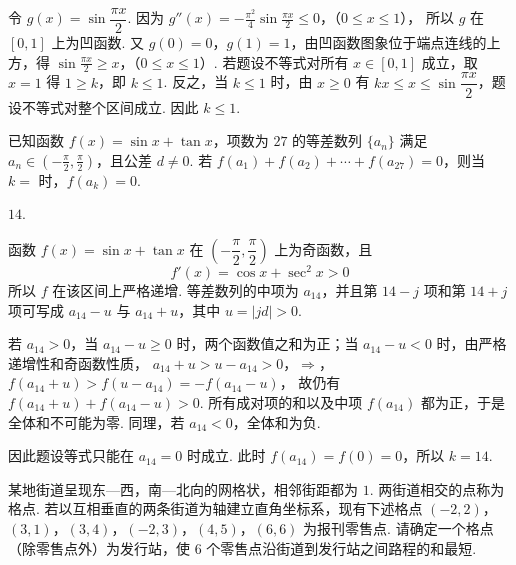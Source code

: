 \begin{solution}
令 \(g(x)=\sin\dfrac{\pi x}{2}\). 因为
\(g''(x)=-\frac{\pi^2}{4}\sin\frac{\pi x}{2}\leqslant0\)，（\(0\leqslant x\leqslant1\)），
所以 \(g\) 在 \([0,1]\) 上为凹函数. 又 \(g(0)=0\)，\(g(1)=1\)，由凹函数图象位于端点连线的上方，得
\(\sin\frac{\pi x}{2}\geqslant x\)，（\(0\leqslant x\leqslant1\)）.
若题设不等式对所有 \(x\in[0,1]\) 成立，取 \(x=1\) 得 \(1\geqslant k\)，即 \(k\leqslant1\). 反之，当 \(k\leqslant1\) 时，由 \(x\geqslant0\) 有 \(kx\leqslant x\leqslant\sin\dfrac{\pi x}{2}\)，题设不等式对整个区间成立. 因此 \(k\leqslant1\).
\end{solution}

\begin{problem}
已知函数 \(f(x) = \sin x + \tan x\)，项数为 \(27\) 的等差数列 \(\{a_n\}\) 满足 \(a_n \in \left( -\frac{\pi}{2}, \frac{\pi}{2} \right)\)，且公差 \(d \neq 0\). 若 \(f(a_1) + f(a_2) + \cdots + f(a_{27}) = 0\)，则当 \(k =\)\fillinblank{} 时，\(f(a_k) = 0\).
\end{problem}

\begin{answer}
\(14\).
\end{answer}

\begin{solution}
函数 \(f(x)=\sin x+\tan x\) 在 \(\left(-\dfrac{\pi}{2},\dfrac{\pi}{2}\right)\) 上为奇函数，且
\[
f'(x)=\cos x+\sec^2x>0
\]
所以 \(f\) 在该区间上严格递增. 等差数列的中项为 \(a_{14}\)，并且第 \(14-j\) 项和第 \(14+j\) 项可写成 \(a_{14}-u\) 与 \(a_{14}+u\)，其中 \(u=|jd|>0\).

若 \(a_{14}>0\)，当 \(a_{14}-u\geqslant0\) 时，两个函数值之和为正；当 \(a_{14}-u<0\) 时，由严格递增性和奇函数性质，
\(a_{14}+u>u-a_{14}>0\)，\(\Longrightarrow\)，\(f(a_{14}+u)>f(u-a_{14})=-f(a_{14}-u)\)，
故仍有 \(f(a_{14}+u)+f(a_{14}-u)>0\). 所有成对项的和以及中项 \(f(a_{14})\) 都为正，于是全体和不可能为零. 同理，若 \(a_{14}<0\)，全体和为负.

因此题设等式只能在 \(a_{14}=0\) 时成立. 此时 \(f(a_{14})=f(0)=0\)，所以 \(k=14\).
\end{solution}

\begin{problem}
某地街道呈现东—西，南—北向的网格状，相邻街距都为 \(1\). 两街道相交的点称为格点. 若以互相垂直的两条街道为轴建立直角坐标系，现有下述格点 \((-2, 2)\)，\((3, 1)\)，\((3, 4)\)，\((-2, 3)\)，\((4, 5)\)，\((6, 6)\) 为报刊零售点. 请确定一个格点（除零售点外）为发行站，使 \(6\) 个零售点沿街道到发行站之间路程的和最短\fillinblank{}.
\end{problem}


